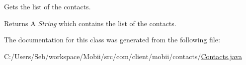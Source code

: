 Gets the list of the contacts. 

\begin{DoxyReturn}{Returns}
A {\itshape String} which contains the list of the contacts. 
\end{DoxyReturn}


The documentation for this class was generated from the following file\-:\begin{DoxyCompactItemize}
\item 
C\-:/\-Users/\-Seb/workspace/\-Mobii/src/com/client/mobii/contacts/\hyperlink{_contacts_8java}{Contacts.\-java}\end{DoxyCompactItemize}
